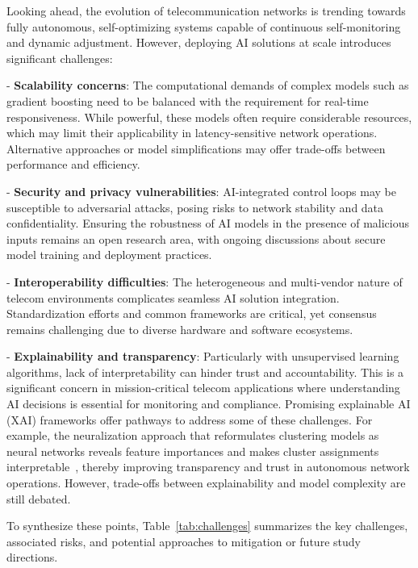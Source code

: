 \documentclass[sigconf]{acmart}
\begin{document}
Looking ahead, the evolution of telecommunication networks is trending towards fully autonomous, self-optimizing systems capable of continuous self-monitoring and dynamic adjustment. However, deploying AI solutions at scale introduces significant challenges:

- \textbf{Scalability concerns}: The computational demands of complex models such as gradient boosting need to be balanced with the requirement for real-time responsiveness. While powerful, these models often require considerable resources, which may limit their applicability in latency-sensitive network operations. Alternative approaches or model simplifications may offer trade-offs between performance and efficiency.

- \textbf{Security and privacy vulnerabilities}: AI-integrated control loops may be susceptible to adversarial attacks, posing risks to network stability and data confidentiality. Ensuring the robustness of AI models in the presence of malicious inputs remains an open research area, with ongoing discussions about secure model training and deployment practices.

- \textbf{Interoperability difficulties}: The heterogeneous and multi-vendor nature of telecom environments complicates seamless AI solution integration. Standardization efforts and common frameworks are critical, yet consensus remains challenging due to diverse hardware and software ecosystems.

- \textbf{Explainability and transparency}: Particularly with unsupervised learning algorithms, lack of interpretability can hinder trust and accountability. This is a significant concern in mission-critical telecom applications where understanding AI decisions is essential for monitoring and compliance. Promising explainable AI (XAI) frameworks offer pathways to address some of these challenges. For example, the neuralization approach that reformulates clustering models as neural networks reveals feature importances and makes cluster assignments interpretable~\cite{ref45}, thereby improving transparency and trust in autonomous network operations. However, trade-offs between explainability and model complexity are still debated.

To synthesize these points, Table~\ref{tab:challenges} summarizes the key challenges, associated risks, and potential approaches to mitigation or future study directions.
\end{document}
